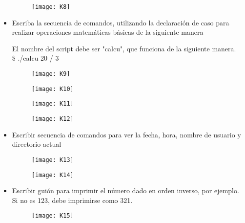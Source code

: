 \documentclass{article}
\begin{document}
\begin{itemize}
\begin{figure}[H]
\centerline{\texttt{[image: K8]}}
\caption{}
\label{fig}
\end{figure}

    \item Escriba la secuencia de comandos, utilizando la declaración de caso para realizar operaciones matemáticas básicas de la siguiente manera

El nombre del script debe ser "calcu", que funciona de la siguiente manera.\\

\$ ./calcu 20 / 3

\begin{figure}[H]
\centerline{\texttt{[image: K9]}}
\caption{}
\label{fig}
\end{figure}

\begin{figure}[H]
\centerline{\texttt{[image: K10]}}
\caption{}
\label{fig}
\end{figure}

\begin{figure}[H]
\centerline{\texttt{[image: K11]}}
\caption{}
\label{fig}
\end{figure}

\begin{figure}[H]
\centerline{\texttt{[image: K12]}}
\caption{}
\label{fig}
\end{figure}

    \item Escribir secuencia de comandos para ver la fecha, hora, nombre de usuario y directorio actual

\begin{figure}[H]
\centerline{\texttt{[image: K13]}}
\caption{}
\label{fig}
\end{figure}

\begin{figure}[H]
\centerline{\texttt{[image: K14]}}
\caption{}
\label{fig}
\end{figure}

    \item Escribir guión para imprimir el número dado en orden inverso, por ejemplo. Si no es 123, debe imprimirse como 321.

\begin{figure}[H]
\centerline{\texttt{[image: K15]}}
\caption{}
\label{fig}
\end{figure}


\end{itemize}
\end{document}
